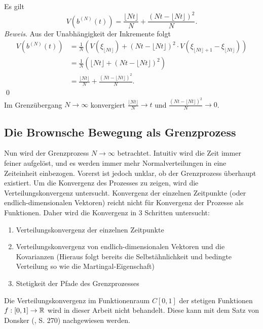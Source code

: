 \begin{lemma}
Es gilt
$$
V(b^{(N)}(t)) = \frac{\lfloor Nt \rfloor}{N} + \frac{(Nt - \lfloor Nt \rfloor)^2}{N}.
$$
\textit{Beweis}. Aus der Unabhängigkeit der Inkremente folgt
$$
\begin{aligned}
V(b^{(N)}(t)) &= \frac{1}{N} \left ( V(\xi_{\lfloor Nt \rfloor}) + (Nt - \lfloor Nt \rfloor)^2 \cdot V(\xi_{\lfloor Nt \rfloor + 1} - \xi_{\lfloor Nt \rfloor}) \right ) 
\\ &= \frac{1}{N} (\lfloor Nt \rfloor + (Nt - \lfloor Nt \rfloor)^2)  
\\ &= \frac{\lfloor Nt \rfloor}{N} + \frac{(Nt - \lfloor Nt \rfloor)^2}{N}.
\end{aligned}
$$
\qed
\\
Im Grenzübergang $N \to \infty$ konvergiert $\frac{\lfloor Nt \rfloor}{N} \to t$ und $\frac{(Nt - \lfloor Nt \rfloor)^2}{N} \to 0$.
\end{lemma}

\subsection{Die Brownsche Bewegung als Grenzprozess}
Nun wird der Grenzprozess $N \to \infty$ betrachtet. Intuitiv wird die Zeit immer feiner aufgelöst,
und es werden immer mehr Normalverteilungen in eine Zeiteinheit einbezogen. Vorerst ist jedoch unklar, 
ob der Grenzprozess überhaupt existiert. Um die Konvergenz des Prozesses zu zeigen, wird die Verteilungskonvergenz 
untersucht. Konvergenz der einzelnen Zeitpunkte (oder endlich-dimensionalen Vektoren) reicht nicht 
für Konvergenz der Prozesse als Funktionen. Daher wird die Konvergenz in 3 Schritten untersucht:
\begin{enumerate}
  \item Verteilungskonvergenz der einzelnen Zeitpunkte
  \item Verteilungskonvergenz von endlich-dimensionalen Vektoren und die Kovarianzen (Hieraus folgt bereits die Selbstähnlichkeit und bedingte Verteilung so wie die Martingal-Eigenschaft)
  \item Stetigkeit der Pfade des Grenzprozesses
\end{enumerate}
Die Verteilungskonvergenz im Funktionenraum $C[0, 1]$ der stetigen Funktionen $f : [0, 1] \to \Bbb R$ wird in dieser Arbeit nicht behandelt.
Diese kann mit dem Satz von Donsker (\cite{henze2022asymptotische}, S. 270) nachgewiesen werden.


